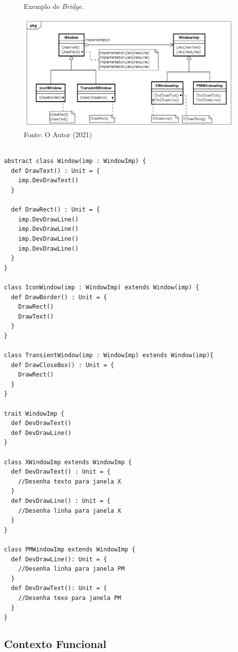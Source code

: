 \begin{figure}[htb]
	\caption{\label{bridge_exemplo}Exemplo de \textit{Bridge}.}
	\begin{center}
	    \includegraphics[scale=0.5]{5_padroes-contexto-funcional/5.2_estruturais/5.2.2_bridge/bridge_exemplo.png}
	\end{center}
  \caption*{Fonte: O Autor (2021)}
\end{figure}

\begin{lstlisting}[caption={\textit{Bridge} Orientado a Objetos.},label=oobridge]

abstract class Window(imp : WindowImp) {
  def DrawText() : Unit = {
    imp.DevDrawText()
  }

  def DrawRect() : Unit = {
    imp.DevDrawLine()
    imp.DevDrawLine()
    imp.DevDrawLine()
    imp.DevDrawLine()
  }
}

class IconWindow(imp : WindowImp) extends Window(imp) {
  def DrawBorder() : Unit = {
    DrawRect()
    DrawText()
  }
}

class TransientWindow(imp : WindowImp) extends Window(imp){
  def DrawCloseBox() : Unit = {
    DrawRect()
  }
}

trait WindowImp {
  def DevDrawText()
  def DevDrawLine()
}

class XWindowImp extends WindowImp {
  def DevDrawText() : Unit = {
    //Desenha texto para janela X
  }
  def DevDrawLine() : Unit = {
    //Desenha linha para janela X
  }
}

class PMWindowImp extends WindowImp {
  def DevDrawLine(): Unit = {
    //Desenha linha para janela PM
  }
  def DevDrawText(): Unit = {
    //Desenha texo para janela PM
  }
}

\end{lstlisting}

\subsection*{Contexto Funcional}

